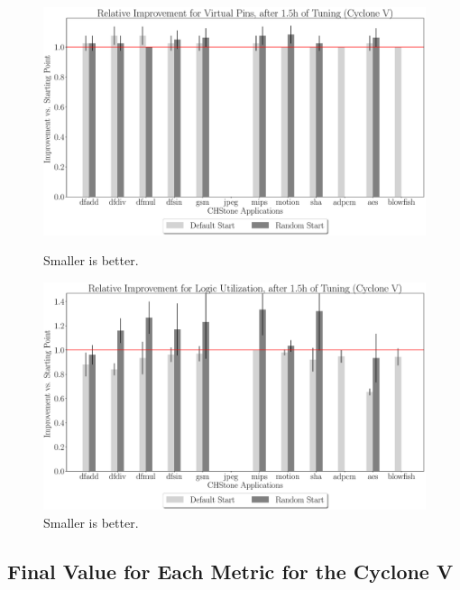 \documentclass[12pt, a4paper]{article}
\begin{document}
\begin{figure}[htpb]
    \begin{minipage}{.48\textwidth}
        \centering
        \includegraphics[width=.8\textwidth]{rel_comp_pins_5400_chstone_CycloneV}
        \caption{Smaller is better.}
    \end{minipage}%
    \begin{minipage}{.48\textwidth}
        \centering
        \includegraphics[width=.8\textwidth]{rel_comp_lu_5400_chstone_CycloneV}
        \caption{Smaller is better.}
    \end{minipage}%
\end{figure}

\clearpage

\subsection{Final Value for Each Metric for the Cyclone V}
\end{document}
